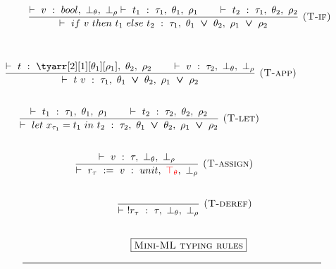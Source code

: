 \documentclass[a4paper,11pt,oneside]{article}
\theoremstyle{plain}
\newcommand{\bvee}{\boldsymbol{~\vee~}}
\newcommand{\typing}[4]{\vdash~#1~:~#2,~#3,~#4}
\newcommand{\bth}{\bot_\theta}
\newcommand{\brh}{\bot_\rho}
\newcommand{\tth}{\top_\theta}
\begin{document}
\begin{figure}[H]
\begin{adjustwidth}{0em}{-3em}
\begin{small}
\begin{minipage}[t]{0.49\linewidth}
\begin{displaymath}
\begin{array}{l}
	\dfrac
	{
		\typing{v}{bool}{\bth}{\brh}
		\typing{t_1}{\tau_1}{\theta_1}{\rho_1} \qquad
		\typing{t_2}{\tau_1}{\theta_2}{\rho_2}
	}
	{	\typing{if~v~then~t_1~else~t_2}
		{\tau_1}{\theta_1 \bvee \theta_2}{\rho_1 \bvee \rho_2}}
	{\textsc{  (T-if)}}	\\[1cm]	
\end{array}
\end{displaymath}
\end{minipage} 
 \hfill 
\begin{minipage}[t]{0.49\linewidth}
\begin{displaymath}
\begin{array}{llr}
\hspace*{-1.5cm}
\dfrac
	{
		\typing{t}{\tyarr[2][1][\theta_1][\rho_1]}{\theta_2}{\rho_2} \qquad
		\typing{v}{\tau_2}{\bth}{\brh}}
	{
		\typing{t~v}{\tau_1}{\theta_1 \bvee \theta_2}{\rho_1 \bvee \rho_2}}
	{
		\textsc{  (T-app)}} \\[1cm]	
\hspace*{-1cm}				
\dfrac
	{
		\typing{t_1}{\tau_1}{\theta_1}{\rho_1} \qquad
		\typing{t_2}{\tau_2}{\theta_2}{\rho_2}
	}
	{\typing
		{let~x_{\tau_1} = t_1~in~t_2}
		{\tau_2}
		{\theta_1 \bvee \theta_2}
		{\rho_1 \bvee \rho_2}}
	{\textsc{  (T-let)}} \\[1cm]					

\hspace*{1cm}		
\dfrac
	{\typing{v}{\tau}{\bth}{\brh}}
	{\typing{r_{\tau}~:=~v}
		{unit}
		{\textcolor{red}{\tth}}
		{\brh}} 			
 	{\textsc{  (T-assign)}}	\\[1cm]		
\hspace*{2.5cm}		   			
\dfrac
	{}
	{\typing{!r_{\tau}}{\tau}{\bth}{\brh}} 
{\textsc{  (T-deref)}}\\[1cm]

\hspace*{3cm}\fbox{\textsc{Mini-ML typing rules}}

\end{array}
\end{displaymath}
\end{minipage} 	 		 
\end{small}
\end{adjustwidth}
\hrule
\label{mini-ml-def-typ}	
\end{figure}    
\end{document}
